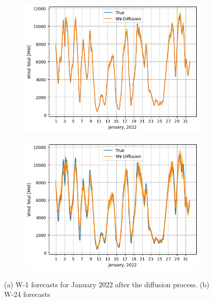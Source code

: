 \documentclass{article}
\begin{document}
\begin{figure}[t]
  \centering
  \begin{subfigure}{.45\textwidth}
    \centering
    \includegraphics[width=1\linewidth]{wind-1-diff.png}
    \caption{}
    \label{fig:wind-1-diff}
  \end{subfigure}%
  \begin{subfigure}{.45\textwidth}
    \centering
    \includegraphics[width=1\linewidth]{wind-24-diff.png}
    \caption{}
    \label{fig:wind-24}
  \end{subfigure}
  \caption{(a) W-1 forecasts for January 2022 after the diffusion process. (b) W-24 forecasts }
  \label{fig:wind}
\end{figure}
\end{document}
